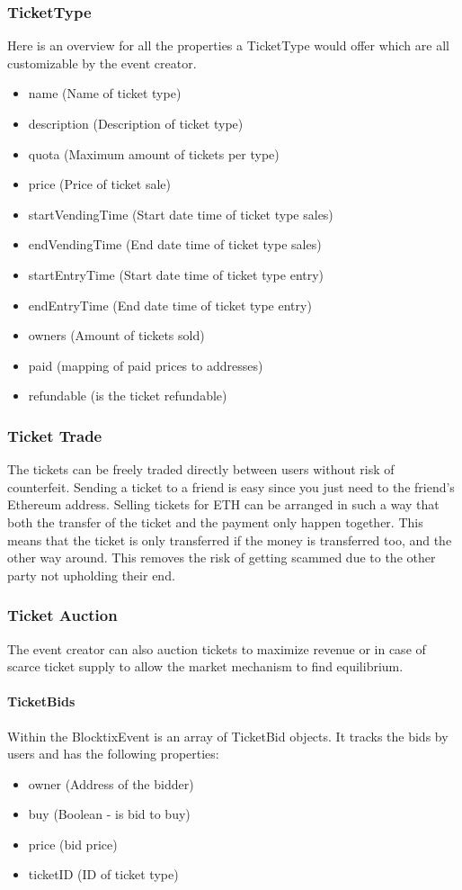 \documentclass[a4paper]{article}
\begin{document}
\subsubsection{TicketType}
Here is an overview for all the properties a TicketType would offer which are all customizable by the event creator.
\begin{itemize}
\item name (Name of ticket type)
\item description (Description of ticket type)
\item quota (Maximum amount of tickets per type)
\item price (Price of ticket sale)
\item startVendingTime (Start date time of ticket type sales)
\item endVendingTime (End date time of ticket type sales)
\item startEntryTime (Start date time of ticket type entry)
\item endEntryTime (End date time of ticket type entry)
\item owners (Amount of tickets sold)
\item paid (mapping of paid prices to addresses)
\item refundable (is the ticket refundable)
\end{itemize}


\subsubsection{Ticket Trade}
The tickets can be freely traded directly between users without risk of counterfeit. Sending a ticket to a friend is easy since you just need to the friend's Ethereum address. Selling tickets for ETH can be arranged in such a way that both the transfer of the ticket and the payment only happen together. This means that the ticket is only transferred if the money is transferred too, and the other way around. This removes the risk of getting scammed due to the other party not upholding their end.

\subsubsection{Ticket Auction}
The event creator can also auction tickets to maximize revenue or in case of scarce ticket supply to allow the market mechanism to find equilibrium. 

\paragraph{TicketBids} 
Within the BlocktixEvent is an array of TicketBid objects. It tracks the bids by users and has the following properties:
\begin{itemize}
\item owner (Address of the bidder)
\item buy (Boolean - is bid to buy)
\item price (bid price)
\item ticketID (ID of ticket type)
\end{itemize}
\end{document}
